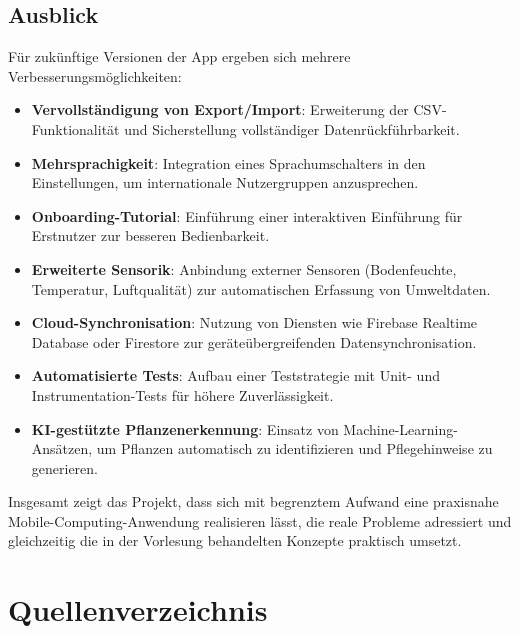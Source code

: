 \documentclass[14pt,a4paper]{report}
\begin{document}
\section{Ausblick}
Für zukünftige Versionen der App ergeben sich mehrere Verbesserungsmöglichkeiten:
\begin{itemize}
    \item \textbf{Vervollständigung von Export/Import}: Erweiterung der CSV-Funktionalität und Sicherstellung vollständiger Datenrückführbarkeit.
    \item \textbf{Mehrsprachigkeit}: Integration eines Sprachumschalters in den Einstellungen, um internationale Nutzergruppen anzusprechen.
    \item \textbf{Onboarding-Tutorial}: Einführung einer interaktiven Einführung für Erstnutzer zur besseren Bedienbarkeit.
    \item \textbf{Erweiterte Sensorik}: Anbindung externer Sensoren (Bodenfeuchte, Temperatur, Luftqualität) zur automatischen Erfassung von Umweltdaten.
    \item \textbf{Cloud-Synchronisation}: Nutzung von Diensten wie Firebase Realtime Database oder Firestore zur geräteübergreifenden Datensynchronisation.
    \item \textbf{Automatisierte Tests}: Aufbau einer Teststrategie mit Unit- und Instrumentation-Tests für höhere Zuverlässigkeit.
    \item \textbf{KI-gestützte Pflanzenerkennung}: Einsatz von Machine-Learning-Ansätzen, um Pflanzen automatisch zu identifizieren und Pflegehinweise zu generieren.
\end{itemize}

Insgesamt zeigt das Projekt, dass sich mit begrenztem Aufwand eine praxisnahe Mobile-Computing-Anwendung realisieren lässt, die reale Probleme adressiert und gleichzeitig die in der Vorlesung behandelten Konzepte praktisch umsetzt.

\chapter{Quellenverzeichnis}
\end{document}
